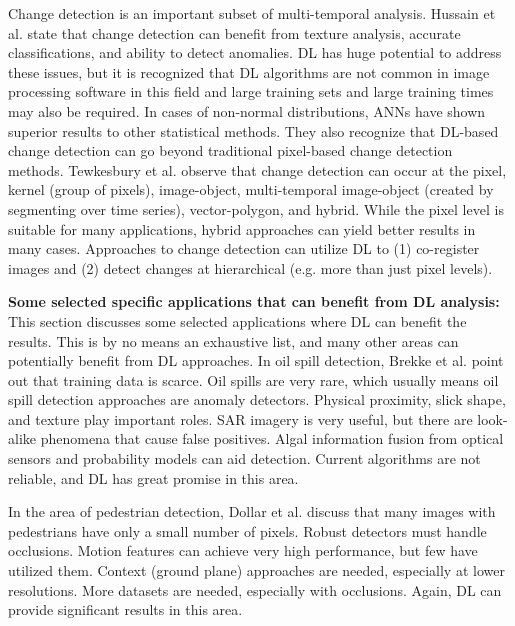 \documentclass[12pt]{spieman}
\begin{document}
\begin{spacing}{1}
Change detection is an important subset of multi-temporal analysis. Hussain et al. \cite{hussain2013change} state that change detection can benefit from texture analysis, accurate classifications, and ability to detect anomalies. DL has huge potential to address these issues, but it is recognized that DL algorithms are not common in image processing software in this field and large training sets and large training times may also be required. In cases of non-normal distributions, ANNs have shown superior results to other statistical methods. They also recognize that DL-based change detection can go beyond traditional pixel-based change detection methods. Tewkesbury et al. \cite{tewkesbury2015critical} observe that change detection can occur at the pixel, kernel (group of pixels), image-object, multi-temporal image-object (created by segmenting over time series), vector-polygon, and hybrid. While the pixel level is suitable for many applications, hybrid approaches can yield better results in many cases. Approaches to change detection can utilize DL to (1) co-register images and (2) detect changes at hierarchical (e.g. more than just pixel levels).


%
%
\textbf{Some selected specific applications that can benefit from DL analysis:} This section discusses some selected applications where DL can benefit the results. This is by no means an exhaustive list, and many other areas can potentially benefit from DL approaches. In oil spill detection, Brekke et al. \cite{brekke2005oil} point out that training data is scarce. Oil spills are very rare, which usually means oil spill detection approaches are anomaly detectors. Physical proximity, slick shape, and texture play important roles. SAR imagery is very useful, but there are look-alike phenomena that cause false positives. Algal information fusion from optical sensors and probability models can aid detection. Current algorithms are not reliable, and DL has great promise in this area.

In the area of pedestrian detection, Dollar et al. \cite{dollar2012pedestrian} discuss that many images with pedestrians have only a small number of pixels. Robust detectors must handle occlusions. Motion features can achieve very high performance, but few have utilized them. Context (ground plane) approaches are needed, especially at lower resolutions. More datasets are needed, especially with occlusions. Again, DL can provide significant results in this area.


\end{spacing}
\end{document}

